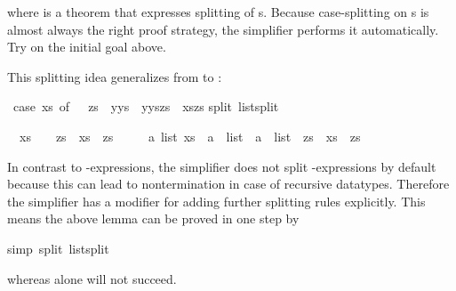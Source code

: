 \begin{isabellebody}
\begin{isamarkuptxt}
\begin{isabelle}
\end{isabelle}
where  is a theorem that expresses splitting of
s. Because
case-splitting on s is almost always the right proof strategy, the
simplifier performs it automatically. Try 
on the initial goal above.

This splitting idea generalizes from  to :%
\end{isamarkuptxt}%
\ {\isachardoublequote}{\isacharparenleft}case\ xs\ of\ {\isacharbrackleft}{\isacharbrackright}\ {\isasymRightarrow}\ zs\ {\isacharbar}\ y{\isacharhash}ys\ {\isasymRightarrow}\ y{\isacharhash}{\isacharparenleft}ys{\isacharat}zs{\isacharparenright}{\isacharparenright}\ {\isacharequal}\ xs{\isacharat}zs{\isachardoublequote}\isanewline
{}split\ list{\isachardot}split{\isacharparenright}%
\begin{isamarkuptxt}%
\begin{isabelle}%
\ {}{\isachardot}\ {\isacharparenleft}xs\ {\isacharequal}\ {\isacharbrackleft}{\isacharbrackright}\ {\isasymlongrightarrow}\ zs\ {\isacharequal}\ xs\ {\isacharat}\ zs{\isacharparenright}\ {\isasymand}\isanewline
\ \ \ \ {\isacharparenleft}{\isasymforall}a\ list{\isachardot}\ xs\ {\isacharequal}\ a\ {\isacharhash}\ list\ {\isasymlongrightarrow}\ a\ {\isacharhash}\ list\ {\isacharat}\ zs\ {\isacharequal}\ xs\ {\isacharat}\ zs{\isacharparenright}%
\end{isabelle}
In contrast to -expressions, the simplifier does not split
-expressions by default because this can lead to nontermination
in case of recursive datatypes. Therefore the simplifier has a modifier
 for adding further splitting rules explicitly. This means the
above lemma can be proved in one step by%
\end{isamarkuptxt}%
simp\ split{\isacharcolon}\ list{\isachardot}split{\isacharparenright}%
\begin{isamarkuptext}%
\noindent
whereas  alone will not succeed.


\end{isamarkuptext}
\end{isabellebody}
